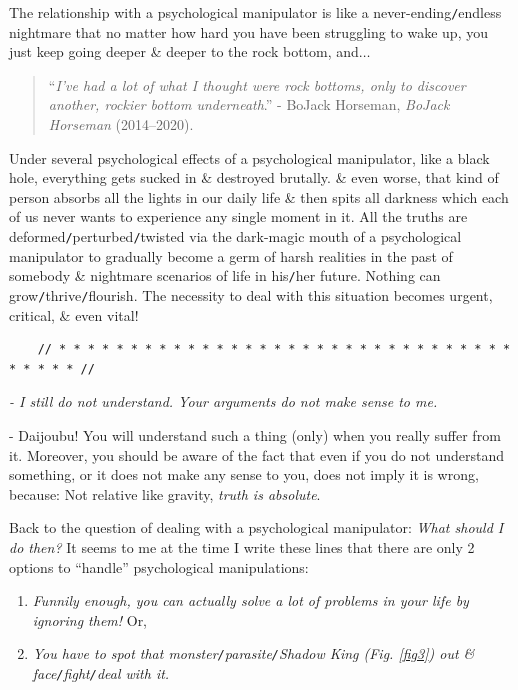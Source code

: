 \documentclass[12pt]{article}
\begin{document}
The relationship with a psychological manipulator is like a never-ending{\tt/}endless nightmare that no matter how hard you have been struggling to wake up, you just keep going deeper \& deeper to the rock bottom, and$\ldots$
\begin{quotation}
	``{\it I've had a lot of what I thought were rock bottoms, only to discover another, rockier bottom underneath}.'' - BoJack Horseman, {\it BoJack Horseman} (2014--2020).
\end{quotation}
Under several psychological effects of a psychological manipulator, like a black hole, everything gets sucked in \& destroyed brutally. \& even worse, that kind of person absorbs all the lights in our daily life \& then spits all darkness which each of us never wants to experience any single moment in it. All the truths are deformed{\tt/}perturbed{\tt/}twisted via the dark-magic mouth of a psychological manipulator to gradually become a germ of harsh realities in the past of somebody \& nightmare scenarios of life in his{\tt/}her future. Nothing can grow{\tt/}thrive{\tt/}flourish. The necessity to deal with this situation becomes urgent, critical, \& even vital!

\begin{verbatim}
	// * * * * * * * * * * * * * * * * * * * * * * * * * * * * * * * * * * * * * //
\end{verbatim}

\noindent
{} {\it - I still do not understand. Your arguments do not make sense to me.}

- Daijoubu! You will understand such a thing (only) when you really suffer from it. Moreover, you should be aware of the fact that even if you do not understand something, or it does not make any sense to you, does not imply it is wrong, because: Not relative like gravity, {\it truth is absolute}.

Back to the question of dealing with a psychological manipulator: {\it What should I do then?} It seems to me at the time I write these lines that there are only 2 options to ``handle'' psychological manipulations:
\begin{enumerate}
	\item {\it Funnily enough, you can actually solve a lot of problems in your life by ignoring them!} Or,
	\item {\it You have to spot that monster{\tt/}parasite{\tt/}Shadow King (Fig. \ref{fig3}) out \& face{\tt/}fight{\tt/}deal with it.}
\end{enumerate}
\end{document}

